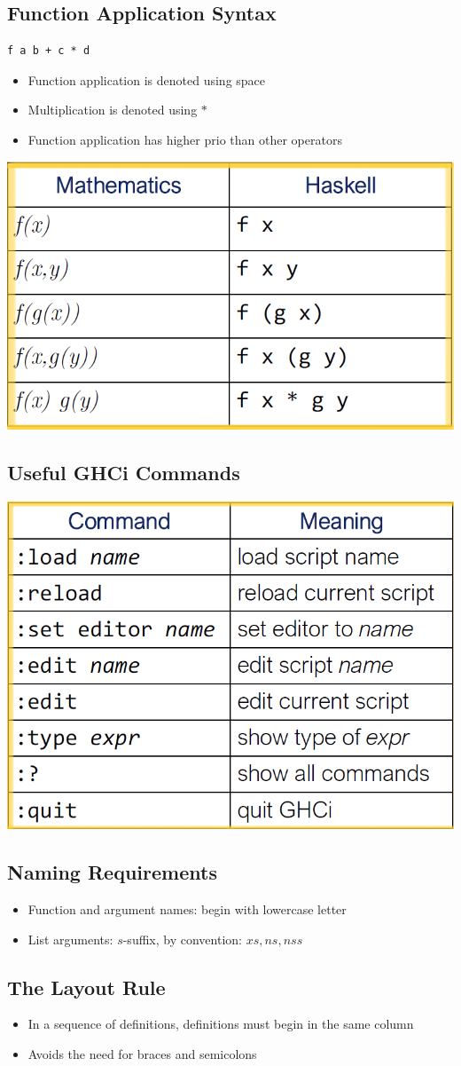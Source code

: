 \subsection{Function Application Syntax}
\begin{lstlisting}
f a b + c * d
\end{lstlisting}
\begin{itemize}
    \item Function application is denoted using space
    \item Multiplication is denoted using $*$
    \item Function application has higher prio than other operators
\end{itemize}
\includegraphics[width=0.6\linewidth]{../img/function_application_syntax.png}\\

\subsection{Useful GHCi Commands}
\includegraphics[width=0.6\linewidth]{../img/ghci_commands.png}\\

\subsection{Naming Requirements}
\begin{itemize}
    \item Function and argument names: begin with lowercase letter
    \item List arguments: $s$-suffix, by convention: $xs, ns, nss$
\end{itemize}

\subsection{The Layout Rule}
\begin{itemize}
    \item In a sequence of definitions, definitions must begin in the same column
    \item Avoids the need for braces and semicolons
\end{itemize}













